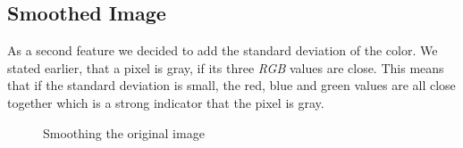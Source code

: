 \documentclass[10pt,conference,compsocconf]{IEEEtran}
\begin{document}
\subsection{Smoothed Image}

As a second feature we decided to add the standard deviation of the color. We stated earlier, that a pixel is gray, if its three \emph{RGB} values are close. This means that if the standard deviation is small, the red, blue and green values are all close together which is a strong indicator that the pixel is gray.

\begin{figure}[t]
	\centering
	
	\caption{Smoothing the original image}
\end{figure}
\end{document}
